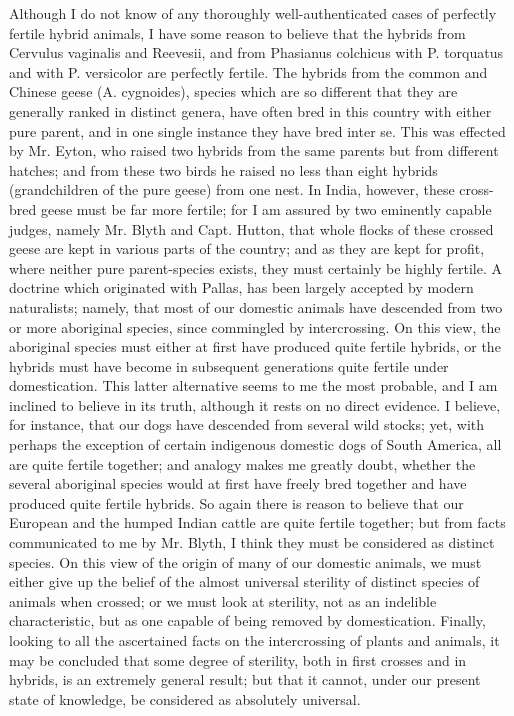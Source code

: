 Although I do not know of any thoroughly well-authenticated cases of perfectly fertile hybrid animals, I have some reason to believe that the hybrids from Cervulus vaginalis and Reevesii, and from Phasianus colchicus with P. torquatus and with P. versicolor are perfectly fertile. The hybrids from the common and Chinese geese (A. cygnoides), species which are so different that they are generally ranked in distinct genera, have often bred in this country with either pure parent, and in one single instance they have bred inter se. This was effected by Mr. Eyton, who raised two hybrids from the same parents but from different hatches; and from these two birds he raised no less than eight hybrids (grandchildren of the pure geese) from one nest. In India, however, these cross-bred geese must be far more fertile; for I am assured by two eminently capable judges, namely Mr. Blyth and Capt. Hutton, that whole flocks of these crossed geese are kept in various parts of the country; and as they are kept for profit, where neither pure parent-species exists, they must certainly be highly fertile.
A doctrine which originated with Pallas, has been largely accepted by modern naturalists; namely, that most of our domestic animals have descended from two or more aboriginal species, since commingled by intercrossing. On this view, the aboriginal species must either at first have produced quite fertile hybrids, or the hybrids must have become in subsequent generations quite fertile under domestication. This latter alternative seems to me the most probable, and I am inclined to believe in its truth, although it rests on no direct evidence. I believe, for instance, that our dogs have descended from several wild stocks; yet, with perhaps the exception of certain indigenous domestic dogs of South America, all are quite fertile together; and analogy makes me greatly doubt, whether the several aboriginal species would at first have freely bred together and have produced quite fertile hybrids. So again there is reason to believe that our European and the humped Indian cattle are quite fertile together; but from facts communicated to me by Mr. Blyth, I think they must be considered as distinct species. On this view of the origin of many of our domestic animals, we must either give up the belief of the almost universal sterility of distinct species of animals when crossed; or we must look at sterility, not as an indelible characteristic, but as one capable of being removed by domestication.
Finally, looking to all the ascertained facts on the intercrossing of plants and animals, it may be concluded that some degree of sterility, both in first crosses and in hybrids, is an extremely general result; but that it cannot, under our present state of knowledge, be considered as absolutely universal.

